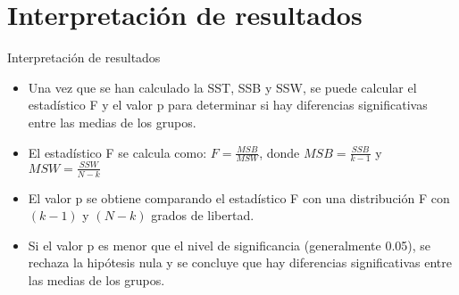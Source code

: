 \documentclass{beamer}
\begin{document}
\section{Interpretación de resultados}

\begin{frame}{Interpretación de resultados}
  \begin{itemize}
      \item Una vez que se han calculado la SST, SSB y SSW, se puede calcular el estadístico F y el valor p para determinar si hay diferencias significativas entre las medias de los grupos.
      \item El estadístico F se calcula como: $F = \frac{MSB}{MSW}$, donde $MSB = \frac{SSB}{k-1}$ y $MSW = \frac{SSW}{N-k}$
      \item El valor p se obtiene comparando el estadístico F con una distribución F con $(k-1)$ y $(N-k)$ grados de libertad.
      \item Si el valor p es menor que el nivel de significancia (generalmente 0.05), se rechaza la hipótesis nula y se concluye que hay diferencias significativas entre las medias de los grupos.
  \end{itemize}
\end{frame}
\end{document}
